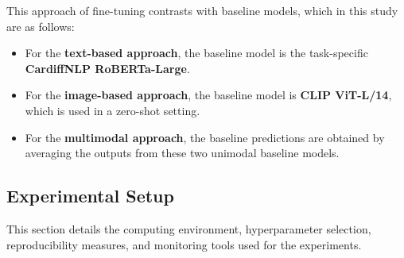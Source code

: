 \begin{table}[ht]
    \centering
    \caption{Architectural Variations}
    \label{tab:architectural_variations}
\end{table}

This approach of fine-tuning contrasts with baseline models, which in this study are as follows:

\begin{itemize}
    \item For the \textbf{text-based approach}, the baseline model is the task-specific \textbf{CardiffNLP RoBERTa-Large}.
    \item For the \textbf{image-based approach}, the baseline model is \textbf{CLIP ViT-L/14},  which is used in a zero-shot setting.
    \item For the \textbf{multimodal approach}, the baseline predictions are obtained by averaging the outputs from these two unimodal baseline models.
\end{itemize}


\subsection{Experimental Setup}
\label{sec:Experimental Setup}
This section details the computing environment, hyperparameter selection, reproducibility measures, and monitoring tools used for the experiments.

